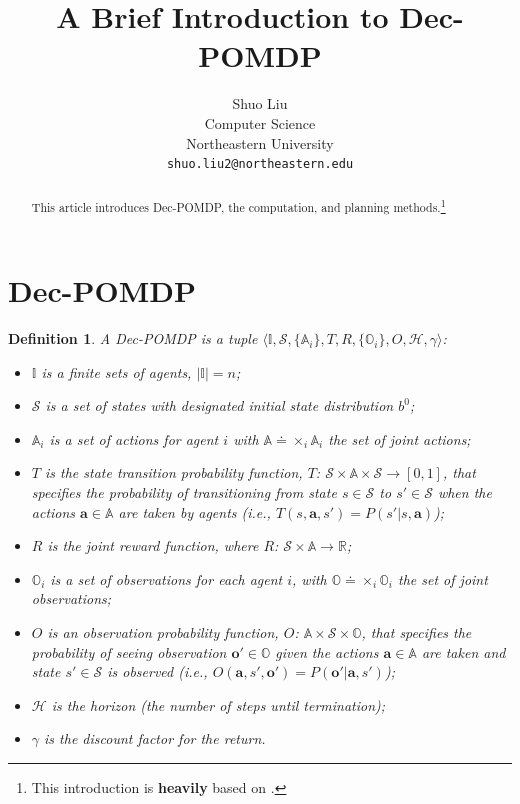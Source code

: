 \documentclass{article} %
\title{A Brief Introduction to Dec-POMDP}
\author{Shuo Liu \\
Computer Science\\
Northeastern University\\
\texttt{shuo.liu2@northeastern.edu} \\
}
\newtheorem{definition}{Definition}
\begin{document}
\maketitle
\vspace{-6mm}
\begin{abstract}
This article introduces Dec-POMDP, the computation, and planning methods.\footnote{This introduction is \textbf{heavily} based on \cite{DecPOMDPsurvey}.}
\end{abstract}

\section{Dec-POMDP}

\begin{definition}
    A Dec-POMDP is a tuple $\langle \mathbb{I}, \mathcal{S}, \{\mathbb{A}_i\}, T, R, \{\mathbb{O}_i\}, O, \mathcal{H}, \gamma\rangle$:
    \begin{itemize}
    \item $\mathbb{I}$ is a finite sets of agents, $|\mathbb{I}|=n$;
    \item $\mathcal{S}$ is a set of states with designated initial state distribution $b^0$;
    \item $\mathbb{A}_i$ is a set of actions for agent $i$ with $\mathbb{A}\doteq \times_i \mathbb{A}_i$ the set of joint actions;
    \item $T$ is the state transition probability function, $T$: $\mathcal{S} \times \mathbb{A} \times \mathcal{S} \rightarrow [0, 1]$, that specifies the probability of transitioning from state $s \in \mathcal{S}$ to $s' \in \mathcal{S}$ when the actions $\boldsymbol{a} \in \mathbb{A}$ are taken by agents (i.e., $T(s, \boldsymbol{a}, s')=P(s'|s, \textbf{a})$);
    \item $R$ is the joint reward function, where $R$: $\mathcal{S} \times \mathbb{A} \rightarrow \mathbb{R}$;
    \item $\mathbb{O}_i$ is a set of observations for each agent $i$, with $\mathbb{O}\doteq\times_i \mathbb{O}_i$ the set of joint observations;
    \item $O$ is an observation probability function, $O$: $\mathbb{A} \times \mathcal{S} \times \mathbb{O}$, that specifies the probability of seeing observation $\boldsymbol{o}' \in \mathbb{O}$ given the actions $\boldsymbol{a} \in \mathbb{A}$ are taken and state $s' \in \mathcal{S}$ is observed (i.e., $O(\boldsymbol{a}, s', \boldsymbol{o}')=P(\boldsymbol{o}'|\textbf{a},s')$);
    \item $\mathcal{H}$ is the horizon (the number of steps until termination);
    \item $\gamma$ is the discount factor for the return. 
\end{itemize}


\end{definition}
\end{document}
